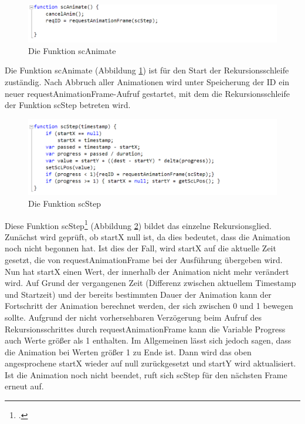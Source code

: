 \begin{figure} [h]
\includegraphics[width=\textwidth]{./img/js_scanim.png}
\caption{Die Funktion scAnimate}
\label{js_scanim}
\end{figure}

Die Funktion scAnimate (Abbildung \ref{js_scanim}) ist für den Start der Rekursionsschleife zuständig. Nach Abbruch aller Animationen wird unter Speicherung der ID ein neuer requestAnimationFrame-Aufruf gestartet, mit dem die Rekursionsschleife der Funktion scStep betreten wird.

\begin{figure} [h]
\includegraphics[width=\textwidth]{./img/js_scstep.png}
\caption{Die Funktion scStep}
\label{js_scstep}
\end{figure}

Diese Funktion scStep\footcite[vgl.][]{rAF} (Abbildung \ref{js_scstep}) bildet das einzelne Rekursionsglied. Zunächst wird geprüft, ob startX null ist, da dies bedeutet, dass die Animation noch nicht begonnen hat. Ist dies der Fall, wird startX auf die aktuelle Zeit gesetzt, die von requestAnimationFrame bei der Ausführung übergeben wird. Nun hat startX einen Wert, der innerhalb der Animation nicht mehr verändert wird. Auf Grund der vergangenen Zeit (Differenz zwischen aktuellem Timestamp und Startzeit) und der bereits bestimmten Dauer der Animation kann der Fortschritt der Animation berechnet werden, der sich zwischen 0 und 1 bewegen sollte. Aufgrund der nicht vorhersehbaren Verzögerung beim Aufruf des Rekursionsschrittes durch requestAnimationFrame kann die Variable Progress auch Werte größer als 1 enthalten. Im Allgemeinen lässt sich jedoch sagen, dass die Animation bei Werten größer 1 zu Ende ist. Dann wird das oben angesprochene startX wieder auf null zurückgesetzt und startY wird aktualisiert. Ist die Animation noch nicht beendet, ruft sich scStep für den nächsten Frame erneut auf.

